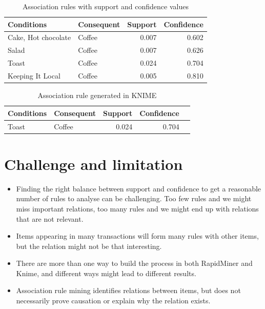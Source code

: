 \begin{table}[H]
\centering
\caption{Association rules with support and confidence values}
\begin{tabular}{l l r r}
\hline
\textbf{Conditions} & \textbf{Consequent} & \textbf{Support} & \textbf{Confidence} \\
\hline
Cake, Hot chocolate & Coffee & 0.007 & 0.602 \\
Salad               & Coffee & 0.007 & 0.626 \\
Toast               & Coffee & 0.024 & 0.704 \\
Keeping It Local    & Coffee & 0.005 & 0.810 \\
\hline
\end{tabular}
\label{tab:rapidminer_rules}
\end{table}

\begin{table}[H]
\centering
\caption{Association rule generated in KNIME}
\begin{tabular}{l l r r r}
\hline
\textbf{Conditions} & \textbf{Consequent} & \textbf{Support} & \textbf{Confidence} \\
\hline
Toast & Coffee & 0.024 & 0.704 \\
\hline
\end{tabular}
\label{tab:knime_rule}
\end{table}

\section{Challenge and limitation}

\begin{itemize}
    \item Finding the right balance between support and confidence to get a reasonable number of rules
    to analyse can be challenging. Too few rules and we might miss important relations, too many rules
    and we might end up with relations that are not relevant.
    
    \item Items appearing in many transactions will form many rules with other items, but the relation
    might not be that interesting.
    
    \item There are more than one way to build the process in both RapidMiner and Knime, and
    different ways might lead to different results.

    \item Association rule mining identifies relations between items, but does not necessarily prove causation
    or explain why the relation exists.
\end{itemize}
